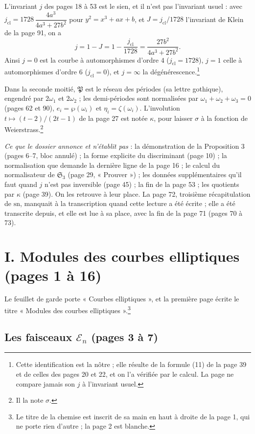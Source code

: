 \documentclass[11pt,a4paper]{article}
\begin{document}
L'invariant $j$ des pages 18 à 53 est le sien, et il n'est pas l'invariant
usuel : avec $j_{\mathrm{cl}} = 1728\,\dfrac{4a^3}{4a^3 + 27b^2}$ pour $y^2 =
x^3 + ax + b$, et $J = j_{\mathrm{cl}}/1728$ l'invariant de Klein de la page 91,
on a
\[
j = 1 - J = 1 - \frac{j_{\mathrm{cl}}}{1728} = \frac{27b^2}{4a^3+27b^2}.
\]
Ainsi $j = 0$ est la courbe à automorphismes d'ordre $4$ ($j_{\mathrm{cl}} =
1728$), $j = 1$ celle à automorphismes d'ordre $6$ ($j_{\mathrm{cl}} = 0$), et
$j = \infty$ la dégénérescence.\footnote{Cette identification est la nôtre ;
elle résulte de la formule (11) de la page 39 et de celles des pages 20 et 22,
et on l'a vérifiée par le calcul. La page ne compare jamais son $j$ à
l'invariant usuel.}

Dans la seconde moitié, $\mathfrak{P}$ est le réseau des périodes (sa lettre
gothique), engendré par $2\omega_1$ et $2\omega_2$ ; les demi-périodes sont
normalisées par $\omega_1 + \omega_2 + \omega_3 = 0$ (pages 62 et 90), $e_i =
\wp(\omega_i)$ et $\eta_i = \zeta(\omega_i)$. L'involution $t \mapsto
(t-2)/(2t-1)$ de la page 27 est notée $\kappa$, pour laisser $\sigma$ à la
fonction de Weierstrass.\footnote{Il la note $\sigma$.}

\emph{Ce que le dossier annonce et n'établit pas} : la démonstration de la
Proposition 3 (pages 6--7, bloc annulé) ; la forme explicite du discriminant
(page 10) ; la normalisation que demande la dernière ligne de la page 16 ; le
calcul du normalisateur de $\mathfrak{S}_3$ (page 29, « Prouver ») ; les données
supplémentaires qu'il faut quand $j$ n'est pas inversible (page 45) ; la fin de
la page 53 ; les quotients par $\kappa$ (page 39). On les retrouve à leur place.
La page 72, troisième récapitulation de $\mathrm{sn}$, manquait à la
transcription quand cette lecture a été écrite ; elle a été transcrite depuis,
et elle est lue à sa place, avec la fin de la page 71 (pages 70 à 73).

\section*{I. Modules des courbes elliptiques (pages 1 à 16)}

Le feuillet de garde porte « Courbes elliptiques », et la première page écrite
le titre « Modules des courbes elliptiques ».\footnote{Le titre de la chemise
est inscrit de sa main en haut à droite de la page 1, qui ne porte rien
d'autre ; la page 2 est blanche.}

\subsection*{Les faisceaux $\mathcal{E}_n$ (pages 3 à 7)}
\end{document}
